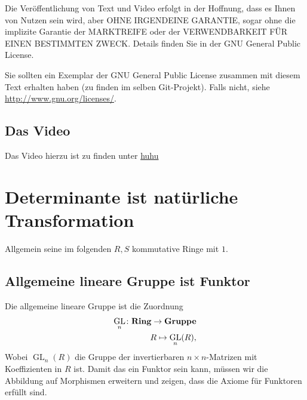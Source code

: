 \documentclass[a4paper]{amsart}
\theoremstyle{definition}
\DeclareMathOperator{\GL}{GL}
\begin{document}
Die Veröffentlichung von Text und Video erfolgt in der Hoffnung, dass es Ihnen von Nutzen sein wird, 
aber OHNE IRGENDEINE GARANTIE, sogar ohne die implizite Garantie der MARKTREIFE oder der 
VERWENDBARKEIT FÜR EINEN BESTIMMTEN ZWECK. Details finden Sie in der GNU General Public License.

Sie sollten ein Exemplar der GNU General Public License zusammen mit diesem Text erhalten haben 
(zu finden im selben Git-Projekt). 
Falls nicht, siehe \url{http://www.gnu.org/licenses/}.

\subsection*{Das Video}
Das Video hierzu ist zu finden unter 
{\tiny
   \url{huhu}
}

\section{Determinante ist natürliche Transformation}
Allgemein seine im folgenden $R, S$ kommutative Ringe mit $1$.

\subsection{Allgemeine lineare Gruppe ist Funktor}
Die allgemeine lineare Gruppe ist die Zuordnung
\begin{align}
   \GL_n \colon \text{\textbf{Ring}} \to \text{\textbf{Gruppe}}\\
   R \mapsto \GL_n(R),
\end{align}
Wobei $\GL_n(R)$ die Gruppe der invertierbaren $n \times n$-Matrizen mit Koeffizienten in $R$ ist.
Damit das ein Funktor sein kann, müssen wir die Abbildung auf Morphismen erweitern und zeigen, dass die Axiome für Funktoren erfüllt sind.
\end{document}
